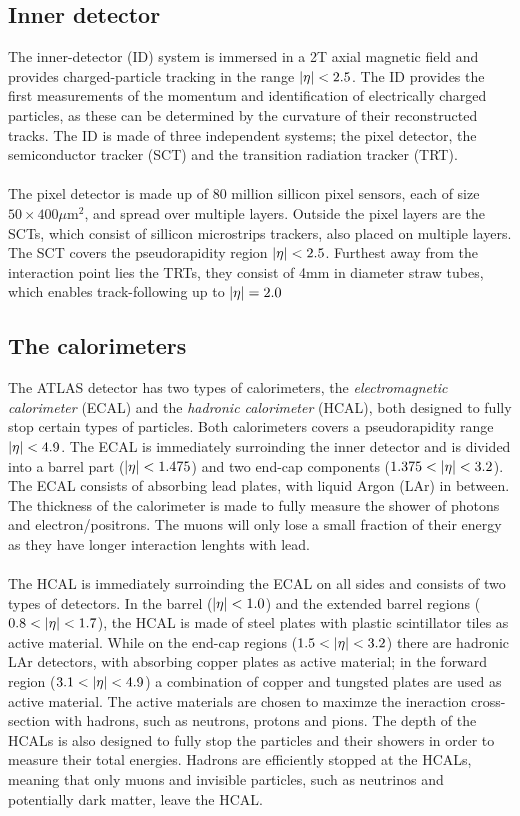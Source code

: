 \documentclass[14pt, a4paper]{book}
\begin{document}
\subsection{Inner detector}\label{sec:ID} 
The inner-detector (ID) system is immersed in a 2T axial magnetic field and provides charged-particle tracking in the range $\abs{\eta}<2.5$. The ID provides the first measurements of the 
momentum and identification of electrically charged particles, as these can be determined by the curvature of their reconstructed tracks. 
The ID is made of three independent systems; the pixel detector, the semiconductor tracker (SCT) and 
the transition radiation tracker (TRT). \\
\\The pixel detector is made up of 80 million sillicon pixel sensors, each of size $50\times400\mu$m$^2$, %
and spread over multiple layers. Outside the pixel layers 
are the SCTs, which consist of sillicon microstrips trackers, also placed on multiple layers. The SCT covers the pseudorapidity region $\abs{\eta}<2.5$. Furthest away from the interaction point lies the TRTs, 
they consist of 4mm in diameter straw tubes, which enables track-following up to $\abs{\eta}=2.0$ 

\subsection{The calorimeters}\label{sec:calories}
The ATLAS detector has two types of calorimeters, the \textit{electromagnetic calorimeter} (ECAL) and the \textit{hadronic calorimeter} (HCAL), both designed to fully stop certain types of particles. 
Both calorimeters covers a pseudorapidity range $\abs{\eta}<4.9$. The ECAL is immediately surroinding the inner detector and is divided into a barrel part ($\abs{\eta}<1.475$) and two end-cap components ($1.375<\abs{\eta}<3.2$). 
The ECAL consists of absorbing lead plates, with liquid Argon (LAr) in between. The thickness of the calorimeter is made to fully measure the shower of photons and electron/positrons. The muons will only lose 
a small fraction of their energy as they have longer interaction lenghts with lead.\\
\\The HCAL is immediately surroinding the ECAL on all sides and consists of two types of detectors. In the barrel ($\abs{\eta}<1.0$) and the extended barrel regions ($0.8<\abs{\eta}<1.7$), the HCAL is made of 
steel plates with plastic scintillator tiles as active material. While on the end-cap regions ($1.5<\abs{\eta}<3.2$) there are hadronic LAr detectors, with absorbing copper plates as active material; in the 
forward region ($3.1<\abs{\eta}<4.9$) a combination of copper and tungsted plates are used as active material. The active materials are chosen to maximze the ineraction cross-section with hadrons, such as neutrons, 
protons and pions. The depth of the HCALs is also designed to fully stop the particles and their showers in order to measure their total energies. Hadrons are efficiently stopped at the HCALs, meaning that only 
muons and invisible particles, such as neutrinos and potentially dark matter, leave the HCAL.
\end{document}
